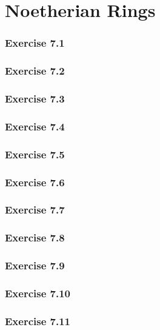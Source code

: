 \documentclass[../A&M.tex]{subfiles}
\begin{document}
\chapter{Noetherian Rings}

\subsection*{Exercise 7.1}

\subsection*{Exercise 7.2}

\subsection*{Exercise 7.3}

\subsection*{Exercise 7.4}

\subsection*{Exercise 7.5}

\subsection*{Exercise 7.6}

\subsection*{Exercise 7.7}

\subsection*{Exercise 7.8}

\subsection*{Exercise 7.9}

\subsection*{Exercise 7.10}

\subsection*{Exercise 7.11}
\end{document}
